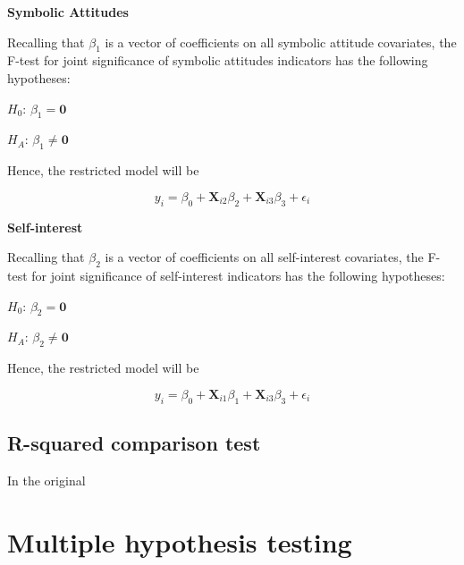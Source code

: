 \documentclass[]{article}
\begin{document}
\textbf{Symbolic Attitudes}

Recalling that \(\beta_1\) is a vector of coefficients on all symbolic
attitude covariates, the F-test for joint significance of symbolic
attitudes indicators has the following hypotheses:

\(H_0\): \(\beta_1 = \textbf{0}\)

\(H_A\): \(\beta_1 \neq \textbf{0}\)

Hence, the restricted model will be

\begin{equation}
y_i = \beta_0 + \textbf{X}_{i2}\beta_2 +  \textbf{X}_{i3}\beta_3 + \epsilon_i
\end{equation}

\textbf{Self-interest}

Recalling that \(\beta_2\) is a vector of coefficients on all
self-interest covariates, the F-test for joint significance of
self-interest indicators has the following hypotheses:

\(H_0\): \(\beta_2 = \textbf{0}\)

\(H_A\): \(\beta_2 \neq \textbf{0}\)

Hence, the restricted model will be

\[y_i = \beta_0 + \textbf{X}_{i1}\beta_1 +  \textbf{X}_{i3}\beta_3 + \epsilon_i\]

\subsection{R-squared comparison test}\label{r-squared-comparison-test}

In the original

\section{Multiple hypothesis testing}\label{multiple-hypothesis-testing}
\end{document}
